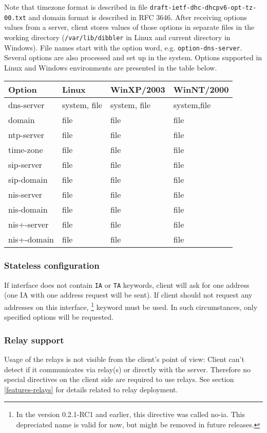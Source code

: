 Note that timezone format is described in file \verb+draft-ietf-dhc-dhcpv6-opt-tz-00.txt+
and domain format is described in RFC 3646. After receiving options
values from a server, client stores values of those options in separate
files in the working directory (\verb+/var/lib/dibbler+ in Linux and
current directory in Windows). File names start with the option word,
e.g. \verb+option-dns-server+. Several options are also processed and
set up in the system. Options supported in Linux and Windows
environments are presented in the table below.


\begin{center}
\begin{tabular}{|l|l|l|l|}
\hline
Option & Linux & WinXP/2003 & WinNT/2000  \\
\hline
dns-server  & system, file & system, file & system,file \\
domain      & file         & file & file \\
ntp-server  & file         & file & file \\
time-zone   & file         & file & file \\
sip-server  & file         & file & file \\
sip-domain  & file         & file & file \\
nis-server  & file         & file & file \\
nis-domain  & file         & file & file \\
nis+-server & file         & file & file \\
nis+-domain & file         & file & file \\
\hline
\end{tabular}
\end{center}

\subsubsection{Stateless configuration}

If interface does not contain \verb+IA+ or \verb+TA+ keywords, client
will ask for one address (one IA with one address request will be sent).
If client should not request any addresses on this interface,
\footnote{In the version 0.2.1-RC1 and earlier, this
  directive was called no-ia. This depreciated name is valid for now,
  but might be removed in future releases.} keyword must be used. In
such circumstances, only specified options will be requested.

\subsubsection{Relay support}
Usage of the relays is not visible from the client's point of view:
Client can't detect if it communicates via relay(s) or directly
with the server. Therefore no special directives on the client side 
are required to use relays. See section \ref{features-relays} for
details related to relay deployment.

